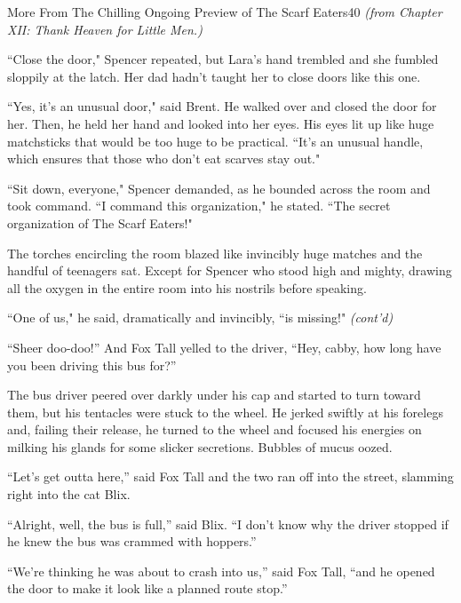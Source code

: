 \documentclass[12pt,twoside]{report}
\begin{document}
	\begin{sidebar}{More From The Chilling Ongoing Preview of The Scarf Eaters}{40}
		\textit{(from Chapter XII: Thank Heaven for Little Men.)}\vspace{6pt}
		
		``Close the door," Spencer repeated, but Lara's hand trembled and she fumbled sloppily at the latch. Her dad hadn't taught her to close doors like this one.\vspace{6pt}

		``Yes, it's an unusual door," said Brent. He walked over and closed the door for her. Then, he held her hand and looked into her eyes. His eyes lit up like huge matchsticks that would be too huge to be practical. ``It's an unusual handle, which ensures that those who don't eat scarves stay out."\vspace{6pt}

		``Sit down, everyone," Spencer demanded, as he bounded across the room and took command. ``I command this organization," he stated. ``The secret organization of The Scarf Eaters!"\vspace{6pt}

		The torches encircling the room blazed like invincibly huge matches and the handful of teenagers sat. Except for Spencer who stood high and mighty, drawing all the oxygen in the entire room into his nostrils before speaking.\vspace{6pt}

		``One of us," he said, dramatically and invincibly, ``is missing!" \textit{(cont'd)}
	\end{sidebar}

``Sheer doo-doo!''  And Fox Tall yelled to the driver, ``Hey, cabby,
how long have you been driving this bus for?''

The bus driver peered over darkly under his cap and started to turn
toward them, but his tentacles were stuck to the wheel.  He jerked
swiftly at his forelegs and, failing their release, he turned to the
wheel and focused his energies on milking his glands for some slicker
secretions.  Bubbles of mucus oozed.

``Let's get outta here,'' said Fox Tall and the two ran off into the
street, slamming right into the cat Blix.

``Alright, well, the bus is full,'' said Blix.  ``I don't know why the
driver stopped if he knew the bus was crammed with hoppers.''

``We're thinking he was about to crash into us,'' said Fox Tall, ``and
he opened the door to make it look like a planned route stop.''
\end{document}
